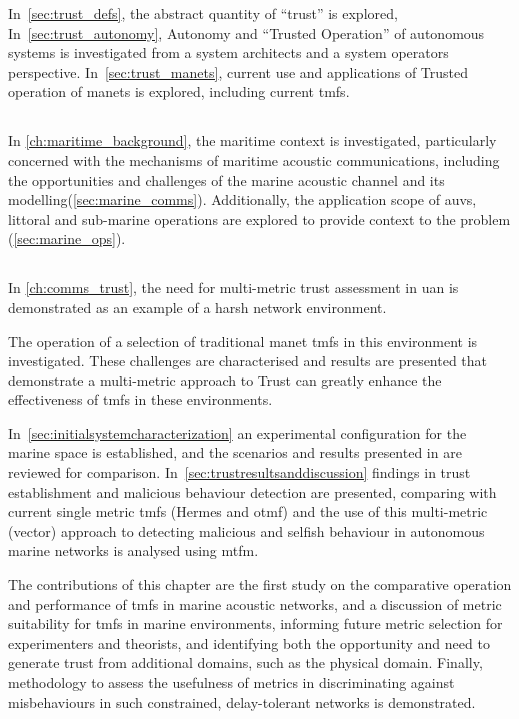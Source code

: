 In~\autoref{sec:trust_defs}, the abstract quantity of ``trust'' is explored,
In~\autoref{sec:trust_autonomy}, Autonomy and ``Trusted Operation'' of autonomous systems is investigated from a system architects and a system operators perspective.
In~\autoref{sec:trust_manets}, current use and applications of Trusted operation of \glspl{manet} is explored, including current \glspl{tmf}.

\subsection{}
In \autoref{ch:maritime_background}, the maritime context is investigated, particularly concerned with the mechanisms of maritime acoustic communications, including the opportunities and challenges of the marine acoustic channel and its modelling(\autoref{sec:marine_comms}).
Additionally, the application scope of \glspl{auv}, littoral and sub-marine operations are explored to provide context to the problem (\autoref{sec:marine_ops}).

\subsection{}
In \autoref{ch:comms_trust}, the need for multi-metric trust assessment in \gls{uan} is demonstrated as an example of a harsh network environment.

The operation of a selection of traditional \gls{manet} \glspl{tmf} in this environment is investigated.
These challenges are characterised and results are presented that demonstrate a multi-metric approach to Trust can greatly enhance the effectiveness of \glspl{tmf} in these environments.

In~\autoref{sec:initialsystemcharacterization} an experimental configuration for the marine space is established, and the scenarios and results presented in \citet{Guo11} are reviewed for comparison.
In~\autoref{sec:trustresultsanddiscussion} findings in trust establishment and malicious behaviour detection are presented, comparing with current single metric \glspl{tmf} (Hermes and \gls{otmf}) and the use of this multi-metric (vector) approach to detecting malicious and selfish behaviour in autonomous marine networks is analysed using \gls{mtfm}.

The contributions of this chapter are the first study on the comparative operation and performance of \glspl{tmf} in marine acoustic networks, and a discussion of metric suitability for \glspl{tmf} in marine environments, informing future metric selection for experimenters and theorists, and identifying both the opportunity and need to generate trust from additional domains, such as the physical domain.
Finally, methodology to assess the usefulness of metrics in discriminating against misbehaviours in such constrained, delay-tolerant networks is demonstrated.


